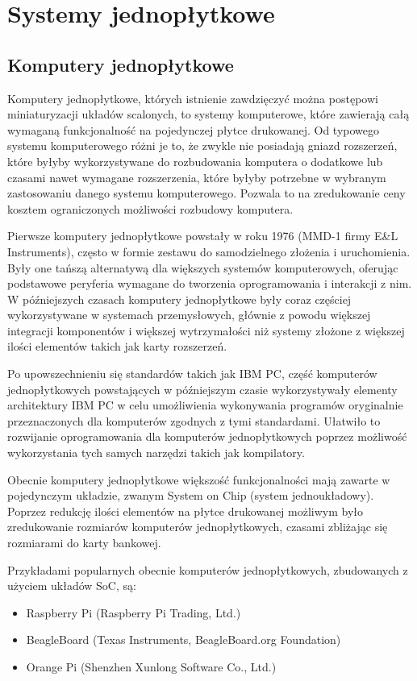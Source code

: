 \section{Systemy jednopłytkowe}

\subsection{Komputery jednopłytkowe}

Komputery jednopłytkowe, których istnienie zawdzięczyć można postępowi miniaturyzacji układów scalonych, to systemy komputerowe, które zawierają całą wymaganą funkcjonalność na pojedynczej płytce drukowanej. Od typowego systemu komputerowego różni je to, że zwykle nie posiadają gniazd rozszerzeń, które byłyby wykorzystywane do rozbudowania komputera o dodatkowe lub czasami nawet wymagane rozszerzenia, które byłyby potrzebne w wybranym zastosowaniu danego systemu komputerowego. Pozwala to na zredukowanie ceny kosztem ograniczonych możliwości rozbudowy komputera.

Pierwsze komputery jednopłytkowe powstały w roku 1976 (MMD-1 firmy E\&L Instruments), często w formie zestawu do samodzielnego złożenia i uruchomienia. Były one tańszą alternatywą dla większych systemów komputerowych, oferując podstawowe peryferia wymagane do tworzenia oprogramowania i interakcji z nim.
W późniejszych czasach komputery jednopłytkowe były coraz częściej wykorzystywane w systemach przemysłowych, głównie z powodu większej integracji komponentów i większej wytrzymałości niż systemy złożone z większej ilości elementów takich jak karty rozszerzeń.

Po upowszechnieniu się standardów takich jak IBM PC, część komputerów jednopłytkowych powstających w późniejszym czasie wykorzystywały elementy architektury IBM PC w celu umożliwienia wykonywania programów oryginalnie przeznaczonych dla komputerów zgodnych z tymi standardami. Ułatwiło to rozwijanie oprogramowania dla komputerów jednopłytkowych poprzez możliwość wykorzystania tych samych narzędzi takich jak kompilatory.

Obecnie komputery jednopłytkowe większość funkcjonalności mają zawarte w pojedynczym układzie, zwanym System on Chip (system jednoukładowy). Poprzez redukcję ilości elementów na płytce drukowanej możliwym było zredukowanie rozmiarów komputerów jednopłytkowych, czasami zbliżając się rozmiarami do karty bankowej.

Przykładami popularnych obecnie komputerów jednopłytkowych, zbudowanych z użyciem układów SoC, są:
\begin{itemize}
	\item Raspberry Pi (Raspberry Pi Trading, Ltd.)
	\item BeagleBoard (Texas Instruments, BeagleBoard.org Foundation)
	\item Orange Pi (Shenzhen Xunlong Software Co., Ltd.)
\end{itemize}

